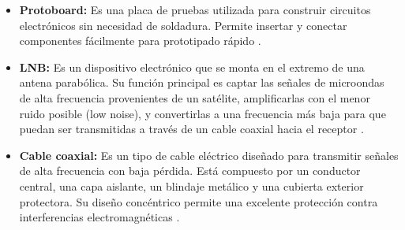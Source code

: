 \begin{itemize}
    \item \textbf{Protoboard:} Es una placa de pruebas utilizada para
    construir circuitos electrónicos sin necesidad de soldadura.
    Permite insertar y conectar componentes fácilmente para
    prototipado rápido \cite{horowitz-1990}.

    \item \textbf{LNB:} Es un dispositivo electrónico que se monta en
    el extremo de una antena parabólica. Su función principal es
    captar las señales de microondas de alta frecuencia provenientes
    de un satélite, amplificarlas con el menor ruido posible (low
    noise), y convertirlas a una frecuencia más baja para que puedan
    ser transmitidas a través de un cable coaxial hacia el receptor
    \cite{lnb}.

    \item \textbf{Cable coaxial:} Es un tipo de cable eléctrico
    diseñado para transmitir señales de alta frecuencia con baja
    pérdida. Está compuesto por un conductor central, una capa
    aislante, un blindaje metálico y una cubierta exterior protectora.
    Su diseño concéntrico permite una excelente protección contra 
    interferencias electromagnéticas \cite{horowitz-1990}.

\end{itemize}



